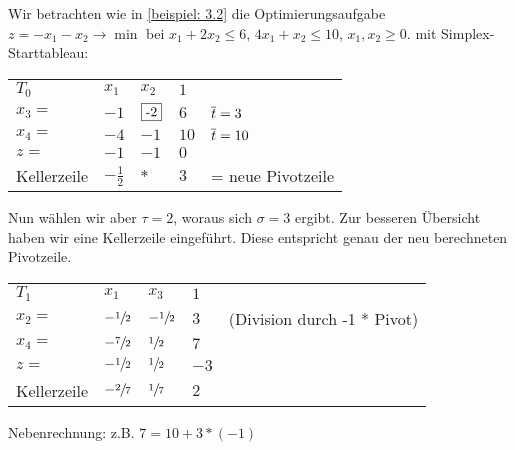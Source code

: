 \vspace{\parskip}

\begin{beispiel} %
	Wir betrachten wie in \cref{beispiel: 3.2} die Optimierungsaufgabe $z = -x_1 - x_2 \to \min$ bei $x_1 + 2 x_2 \le 6$, $4x_1 + x_2 \le 10$, $x_1, x_2 \ge 0$. mit Simplex-Starttableau:
	\begin{indentpar}
		\begin{tabular}{R{1.8cm}|R{0.6cm}R{0.6cm}|R{0.6cm} l}
			$T_0$ & $x_1$ & $x_2$ & $1$ \\ 
			$x_3 = $ & $-1$ & $\fbox{-2}$ & $6$ & {\footnotesize $\overline{t} = 3$} \\ 
			$x_4 = $ & $-4$ & $-1$ & $10$ & {\footnotesize $\overline{t} = 10$} \\ 
			$z =$ & $-1$ & $-1$    & $0$ \\ 
			Kellerzeile & $-\frac{1}{2}$ & $\ast$ & $3$ & {\footnotesize = neue Pivotzeile}
		\end{tabular}
	\end{indentpar}
	Nun wählen wir aber $\tau = 2$, woraus sich $\sigma =  3$ ergibt.
	Zur besseren Übersicht haben wir eine Kellerzeile eingeführt. Diese entspricht genau der neu berechneten Pivotzeile.
	\begin{indentpar}
		\begin{tabular}{R{1.8cm}|R{0.6cm}R{0.6cm}|R{0.6cm} l}
			$T_1$ & $x_1$ & \textcolor{cdpurple}{$x_3$} & $1$ \\ \cline{1-4}
			\textcolor{cdpurple}{$x_2 = $} & $- \sfrac{1}{2}$ & $-\sfrac{1}{2}$ & $3$ & {\footnotesize (Division durch -1 * Pivot)} \\ 
			$x_4 = $ & $-\sfrac{7}{2}$ & $\sfrac{1}{2}$ & $7$ \\ \cline{1-4}
			$z =$ & $-\sfrac{1}{2}$ & $\sfrac{1}{2}$  & $-3$ \\ \cline{1-4}
			Kellerzeile & $-\sfrac{2}{7}$ & $\sfrac{1}{7}$ & $2$
		\end{tabular}
	\end{indentpar}
	Nebenrechnung: z.B. $ 7 = 10 + 3 * (-1)$
	

\end{beispiel}

